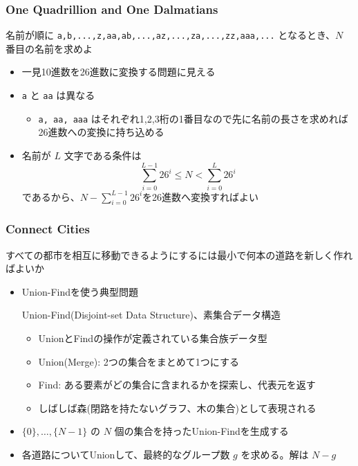 \documentclass[t, aspectratio=169, dvipdfmx]{beamer}
\begin{document}
\begin{frame}[containsverbatim]
  \frametitle{One Quadrillion and One Dalmatians}
  名前が順に \verb|a,b,...,z,aa,ab,...,az,...,za,...,zz,aaa,...| となるとき、$N$ 番目の名前を求めよ
  \begin{itemize}
    \item 一見10進数を26進数に変換する問題に見える
    \item \verb|a| と \verb|aa| は異なる
    \begin{itemize}
      \item \verb|a, aa, aaa| はそれぞれ1,2,3桁の1番目なので先に名前の長さを求めれば26進数への変換に持ち込める
    \end{itemize}
    \item 名前が $L$ 文字である条件は
    $$\sum_{i=0}^{L-1}26^i \leq N < \sum_{i=0}^{L}26^i$$
    であるから、$N - \sum_{i=0}^{L-1}26^i$を26進数へ変換すればよい
  \end{itemize}
\end{frame}

\begin{frame}[c]
\end{frame}

\begin{frame}
  \frametitle{Connect Cities}
  すべての都市を相互に移動できるようにするには最小で何本の道路を新しく作ればよいか
  \begin{itemize}
    \item Union-Findを使う典型問題
    \begin{term}{Union-Find(Disjoint-set Data Structure)、素集合データ構造}
      \begin{itemize}
        \item UnionとFindの操作が定義されている集合族データ型
        \item Union(Merge): 2つの集合をまとめて1つにする
        \item Find: ある要素がどの集合に含まれるかを探索し、代表元を返す
        \item しばしば森(閉路を持たないグラフ、木の集合)として表現される
      \end{itemize}
    \end{term}
    \item $\{0\},\ldots,\{N-1\}$ の $N$ 個の集合を持ったUnion-Findを生成する
    \item 各道路についてUnionして、最終的なグループ数 $g$ を求める。解は $N-g$
  \end{itemize}
\end{frame}
\end{document}
